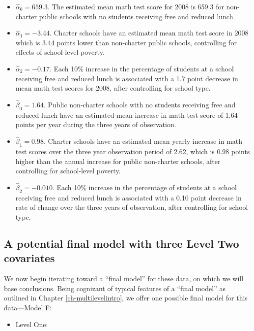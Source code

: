 \documentclass[
]{krantz}
\providecommand{\tightlist}{%
  \setlength{\itemsep}{0pt}\setlength{\parskip}{0pt}}
\begin{document}
\begin{itemize}
\item
  \(\hat{\alpha}_{0}= 659.3.\) The estimated mean math test score for 2008 is 659.3 for non-charter public schools with no students receiving free and reduced lunch.
\item
  \(\hat{\alpha}_{1}= -3.44.\) Charter schools have an estimated mean math test score in 2008 which is 3.44 points lower than non-charter public schools, controlling for effects of school-level poverty.
\item
  \(\hat{\alpha}_{2}= -0.17.\) Each 10\% increase in the percentage of students at a school receiving free and reduced lunch is associated with a 1.7 point decrease in mean math test scores for 2008, after controlling for school type.
\item
  \(\hat{\beta}_{0}= 1.64.\) Public non-charter schools with no students receiving free and reduced lunch have an estimated mean increase in math test score of 1.64 points per year during the three years of observation.
\item
  \(\hat{\beta}_{1}= 0.98.\) Charter schools have an estimated mean yearly increase in math test scores over the three year observation period of 2.62, which is 0.98 points higher than the annual increase for public non-charter schools, after controlling for school-level poverty.
\item
  \(\hat{\beta}_{2}= -0.010.\) Each 10\% increase in the percentage of students at a school receiving free and reduced lunch is associated with a 0.10 point decrease in rate of change over the three years of observation, after controlling for school type.
\end{itemize}

\hypertarget{modelf9}{%
\subsection{A potential final model with three Level Two covariates}\label{modelf9}}

We now begin iterating toward a ``final model'' for these data, on which we will base conclusions. Being cognizant of typical features of a ``final model'' as outlined in Chapter \ref{ch-multilevelintro}, we offer one possible final model for this data---Model F:

\begin{itemize}
\tightlist
\item
  Level One:
\end{itemize}
\end{document}
